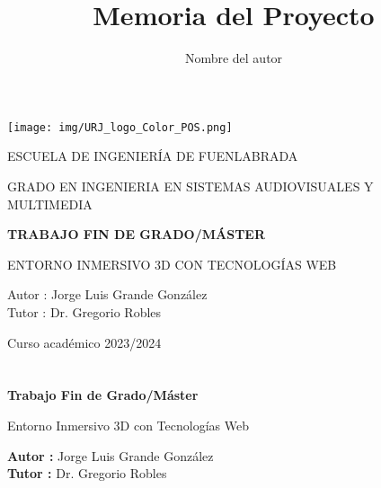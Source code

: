 \documentclass[a4paper, 12pt]{book}
\title{Memoria del Proyecto}
\author{Nombre del autor}
\begin{document}
\renewcommand{\refname}{Bibliografía}  %
\renewcommand{\appendixname}{Apéndice}



\begin{titlepage}
\begin{center}
\texttt{[image: img/URJ\_logo\_Color\_POS.png]}

\vspace{1.75cm}

\LARGE
ESCUELA DE INGENIERÍA DE FUENLABRADA
\vspace{1cm}

\LARGE
GRADO EN INGENIERIA EN SISTEMAS AUDIOVISUALES Y MULTIMEDIA

\vspace{1cm}
\LARGE
\textbf{TRABAJO FIN DE GRADO/MÁSTER}

\vspace{2cm}

\Large
ENTORNO INMERSIVO 3D CON TECNOLOGÍAS WEB

\vspace{2cm}

\large
Autor : Jorge Luis Grande González \\
Tutor : Dr. Gregorio Robles\\
\vspace{1cm}

\large
Curso académico 2023/2024

\end{center}
\end{titlepage}

\newpage
\mbox{}
\thispagestyle{empty} %



\clearpage
{}
\chapter*{}

\vspace{-4cm}
\begin{center}
\LARGE
\textbf{Trabajo Fin de Grado/Máster}

\vspace{1cm}
\large
Entorno Inmersivo 3D con Tecnologías Web

\vspace{1cm}
\large
\textbf{Autor :} Jorge Luis Grande González \\
\textbf{Tutor :} Dr. Gregorio Robles

\end{center}
\end{document}
